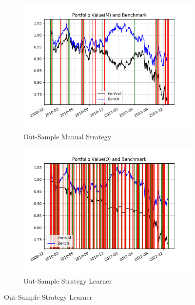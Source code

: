 \documentclass[12pt]{article}
\begin{document}
\begin{figure}
\begin{subfigure}{.5\textwidth}
\includegraphics[scale=0.5]{osme1.png}
\caption{Out-Sample Manual Strategy}
\end{subfigure}
\begin{subfigure}{.5\textwidth}
\includegraphics[scale=0.5]{osqe1.png}
\caption{Out-Sample Strategy Learner}
\end{subfigure}
\end{figure}
\text{ }\\
\end{document}
